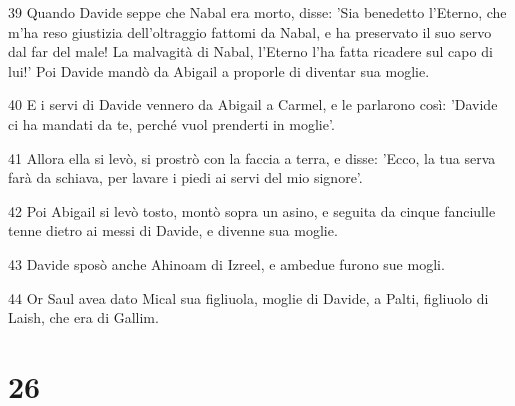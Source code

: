 \par 39 Quando Davide seppe che Nabal era morto, disse: 'Sia benedetto l'Eterno, che m'ha reso giustizia dell'oltraggio fattomi da Nabal, e ha preservato il suo servo dal far del male! La malvagità di Nabal, l'Eterno l'ha fatta ricadere sul capo di lui!' Poi Davide mandò da Abigail a proporle di diventar sua moglie.
\par 40 E i servi di Davide vennero da Abigail a Carmel, e le parlarono così: 'Davide ci ha mandati da te, perché vuol prenderti in moglie'.
\par 41 Allora ella si levò, si prostrò con la faccia a terra, e disse: 'Ecco, la tua serva farà da schiava, per lavare i piedi ai servi del mio signore'.
\par 42 Poi Abigail si levò tosto, montò sopra un asino, e seguita da cinque fanciulle tenne dietro ai messi di Davide, e divenne sua moglie.
\par 43 Davide sposò anche Ahinoam di Izreel, e ambedue furono sue mogli.
\par 44 Or Saul avea dato Mical sua figliuola, moglie di Davide, a Palti, figliuolo di Laish, che era di Gallim.

\chapter{26}

